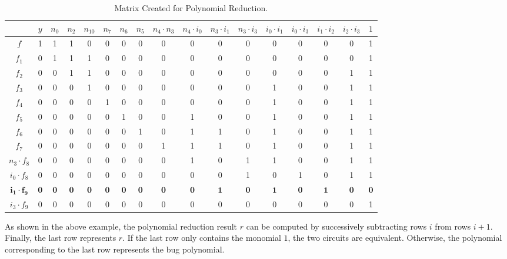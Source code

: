 \begin{Example}
	
	\begin{table} 
	\begin{center}
	\caption{Matrix Created for Polynomial Reduction.} 
	\label{tab:redres}
	\begin{tabular}[hbt]{|c||c|c|c|c|c|c|c|c|c|c|c|c|c|c|c|c|} \hline 
				&$y$ 	&$n_0$ &$n_2$	&$n_{10}$	 &$n_7$	&$n_6$  &$n_5$   &$n_4\cdot n_3$  &$n_4\cdot i_0$ 	&$n_3\cdot i_1$	&$n_3\cdot i_3$	&$i_0\cdot i_1$		&$i_0\cdot i_3$ 	&$i_1\cdot i_2$	 &$i_2\cdot i_3$   &$1$ \\
		\hline
		$f$   		&1	&1	&1	&0		&0	&0	&0	&0	&0	&0	&0	&0	&0	&0	&0	&1 \\
		\hline
		$f_1$ 		&0	&1	&1	&1		&0	&0	&0	&0	&0	&0	&0	&0	&0	&0	&0	&1 \\
		\hline
		$f_2$ 		&0	&0	&1	&1		&0	&0	&0	&0	&0	&0	&0	&0	&0	&0	&1	&1 \\
		\hline
		$f_3$		&0	&0	&0	&1		&0	&0	&0	&0	&0	&0	&0	&1	&0	&0	&1	&1 \\
		\hline
		$f_4$		&0	&0	&0	&0		&1	&0	&0	&0	&0	&0	&0	&1	&0	&0	&1	&1\\
		\hline{}
		$f_5$		&0	&0	&0	&0		&0	&1	&0	&0	&1	&0	&0	&1	&0	&0	&1	&1\\
		\hline{}
		$f_6$		&0	&0	&0	&0		&0	&0	&1	&0	&1	&1	&0	&1	&0	&0	&1	&1\\
		\hline{}
		$f_7$		&0	&0	&0	&0		&0	&0	&0	&1	&1	&1	&0	&1	&0	&0	&1	&1\\
	\hline{}
$n_3\cdot f_{8}$	&0	&0	&0	&0		&0	&0	&0	&0	&1	&0	&1	&1	&0	&0	&1	&1\\
	\hline{}
$i_0\cdot f_{8}$ 	&0	&0	&0	&0		&0	&0	&0	&0	&0	&0	&1	&0	&1	&0	&1	&1\\
	\hline
$\mathbf{i_1 \cdot f_{9}}$	&$\mathbf{0}$	&$\mathbf{0}$	&$\mathbf{0}$	&$\mathbf{0}$	&$\mathbf{0}$	&$\mathbf{0}$	&$\mathbf{0}$	
&$\mathbf{0}$	&$\mathbf{0}$	&$\mathbf{1}$	&$\mathbf{0}$	&$\mathbf{1}$	&$\mathbf{0}$	&$\mathbf{1}$	&$\mathbf{0}$	&$\mathbf{0}$\\
	\hline
$i_3 \cdot f_{9}$	&0	&0	&0	&0		&0	&0	&0	&0	&0	&0	&0	&0	&0	&0	&0	&1\\
	\hline
	\end{tabular}
	\end{center}
	\end{table} 
\end{Example}


As shown in the above example, the polynomial reduction
result $r$ can be computed by successively subtracting  rows $i$ from
rows $i+1$. Finally, the last row represents $r$. If the last row only
contains the monomial $1$, the two circuits are equivalent. Otherwise, the
polynomial corresponding to the last row represents the bug polynomial. 

